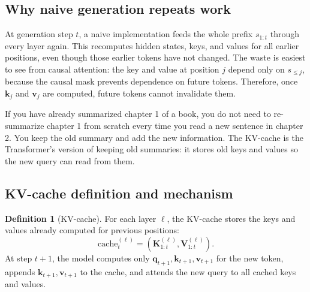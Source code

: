 \documentclass[11pt,a4paper]{article}
\theoremstyle{definition}
\newtheorem{definition}{Definition}[section]
\theoremstyle{plain}
\newcommand{\vq}{\bm{q}}
\newcommand{\vk}{\bm{k}}
\newcommand{\vv}{\bm{v}}
\newcommand{\mK}{\bm{K}}
\newcommand{\mV}{\bm{V}}
\begin{document}
\subsection{Why naive generation repeats work}

At generation step $t$, a naive implementation feeds the whole prefix $s_{1:t}$ through every layer again. This recomputes hidden states, keys, and values for all earlier positions, even though those earlier tokens have not changed. The waste is easiest to see from causal attention: the key and value at position $j$ depend only on $s_{\leq j}$, because the causal mask prevents dependence on future tokens. Therefore, once $\vk_j$ and $\vv_j$ are computed, future tokens cannot invalidate them.

\begin{intuitionbox}
If you have already summarized chapter 1 of a book, you do not need to re-summarize chapter 1 from scratch every time you read a new sentence in chapter 2. You keep the old summary and add the new information. The KV-cache is the Transformer's version of keeping old summaries: it stores old keys and values so the new query can read from them.
\end{intuitionbox}

\subsection{KV-cache definition and mechanism}

\begin{definition}[KV-cache]
For each layer $\ell$, the KV-cache stores the keys and values already computed for previous positions:
\begin{equation}
    \mathrm{cache}^{(\ell)}_t=\left(\mK^{(\ell)}_{1:t},\mV^{(\ell)}_{1:t}\right).
\end{equation}
At step $t+1$, the model computes only $\vq_{t+1},\vk_{t+1},\vv_{t+1}$ for the new token, appends $\vk_{t+1},\vv_{t+1}$ to the cache, and attends the new query to all cached keys and values.
\end{definition}
\end{document}
